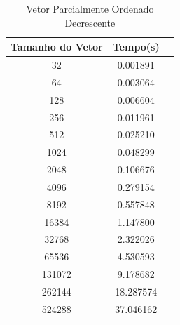 \documentclass[12pt,a4paper,twoside]{report}
\begin{document}
\begin{table}[h]
  \centering
  \caption{Vetor Parcialmente Ordenado Decrescente \label{tab:pod}}
  \begin{tabular}{ccc} \\\hline
  \textbf{Tamanho do Vetor}  & \textbf{Tempo(s)} \\\hline
  32                              & 0.001891          \\\hline
  64                              & 0.003064         \\\hline
  128                             & 0.006604          \\\hline
  256                             & 0.011961          \\\hline
  512                             & 0.025210          \\\hline
  1024                            & 0.048299          \\\hline
  2048                            & 0.106676          \\\hline
  4096                            & 0.279154         \\\hline
  8192                            & 0.557848         \\\hline
  16384                           & 1.147800
  \\\hline
  32768                           & 2.322026         \\\hline
  65536                           & 4.530593         \\\hline
  131072                          & 9.178682         \\\hline
  262144                          & 18.287574         \\\hline
  524288                          & 37.046162         \\\hline
  \end{tabular}
\end{table}
\end{document}
